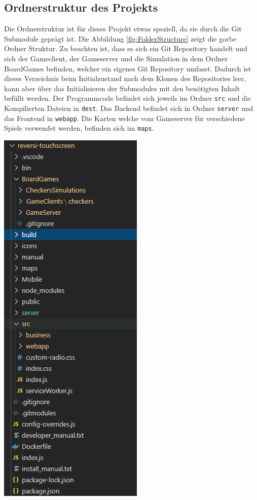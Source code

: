 \documentclass[12pt,a4paper,bibliography=totocnumbered,listof=totocnumbered]{article}
\begin{document}
\begin{appendix}
\pagebreak

\section{Ordnerstruktur des Projekts}
Die Ordnerstruktur ist für dieses Projekt etwas speziell, da sie durch die Git Submodule geprägt ist.
Die Abbildung \ref{fig:FolderStructure} zeigt die gorbe Ordner Struktur. Zu beachten ist, dass es sich ein Git Repository handelt und sich
der Gameclient, der Gameserver und die Simulation in dem Ordner BoardGames befinden, welcher ein eigenes Git Repository umfasst. 
Dadurch ist dieses Verzeichnis beim Initialzustand nach dem Klonen des Repositories leer, kann aber über das Initialisieren der Submodules 
mit den benötigten Inhalt befüllt werden. Der Programmcode befindet sich jeweils im Ordner \texttt{src} und die Kompilierten Dateien 
in \texttt{dest}. Das Backend befindet sich in Ordner \texttt{server} und das Frontend in \texttt{webapp}. Die Karten welche vom Gameserver 
für verschiedene Spiele verwendet werden, befinden sich im \texttt{maps}.

\vspace{1em}
\begin{minipage}{\linewidth}
	\centering
	\includegraphics[width=0.4\linewidth]{pics/FolderStructure.png}
    \label{fig:FolderStructure}
\end{minipage}


\end{appendix}
\end{document}
